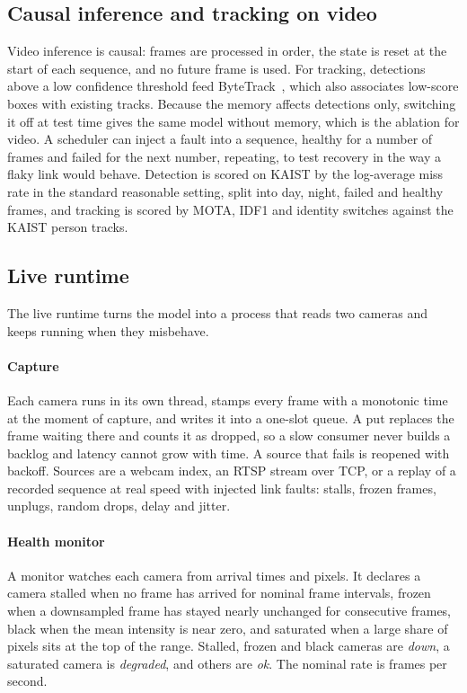 \subsection{Causal inference and tracking on video}
\label{sec:causal}
Video inference is causal: frames are processed in order, the state is reset at the start of each sequence, and no future frame is used. For tracking, detections above a low confidence threshold feed ByteTrack~\cite{zhang2022bytetrack}, which also associates low-score boxes with existing tracks. Because the memory affects detections only, switching it off at test time gives the same model without memory, which is the ablation for video. A scheduler can inject a fault into a sequence, healthy for a number of frames and failed for the next number, repeating, to test recovery in the way a flaky link would behave. Detection is scored on KAIST by the log-average miss rate in the standard reasonable setting, split into day, night, failed and healthy frames, and tracking is scored by MOTA, IDF1 and identity switches against the KAIST person tracks.

\subsection{Live runtime}
\label{sec:live}
The live runtime turns the model into a process that reads two cameras and keeps running when they misbehave.

\paragraph{Capture}
Each camera runs in its own thread, stamps every frame with a monotonic time at the moment of capture, and writes it into a one-slot queue. A put replaces the frame waiting there and counts it as dropped, so a slow consumer never builds a backlog and latency cannot grow with time. A source that fails is reopened with backoff. Sources are a webcam index, an RTSP stream over TCP, or a replay of a recorded sequence at real speed with injected link faults: stalls, frozen frames, unplugs, random drops, delay and jitter.

\paragraph{Health monitor}
A monitor watches each camera from arrival times and pixels. It declares a camera stalled when no frame has arrived for \cfgStallIntervals{} nominal frame intervals, frozen when a downsampled frame has stayed nearly unchanged for \cfgFreezeFrames{} consecutive frames, black when the mean intensity is near zero, and saturated when a large share of pixels sits at the top of the range. Stalled, frozen and black cameras are \emph{down}, a saturated camera is \emph{degraded}, and others are \emph{ok}. The nominal rate is \cfgNominalFps{} frames per second.

